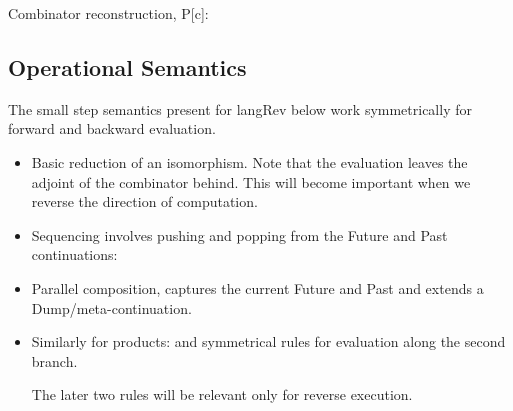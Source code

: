 \documentclass[preprint]{easychair}
\begin{document}
Combinator reconstruction, {{P[c]}}: 

\subsection{Operational Semantics}

The small step semantics present for {{langRev}} below work
symmetrically for forward and backward evaluation.

\begin{itemize}
\item 
Basic reduction of an isomorphism. Note that the evaluation leaves the
adjoint of the combinator behind. This will become important when we
reverse the direction of computation.

\item
Sequencing involves pushing and popping from the Future and Past
continuations:


\item
Parallel composition, captures the current Future and Past and extends
a Dump/meta-continuation.


\item
Similarly for products:
and symmetrical rules for evaluation along the second branch. 

The later two rules will be relevant only for reverse execution. 

\end{itemize}
\end{document}
